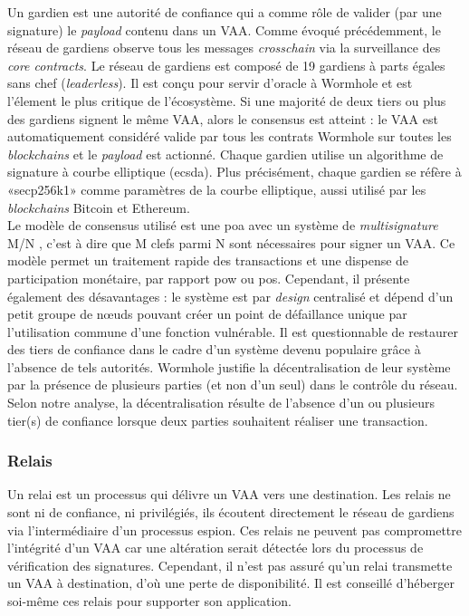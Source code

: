 Un gardien \cite{wormholeGuardian} est une autorité de confiance qui a comme rôle de valider 
(par une signature) le \textit{payload} contenu dans un VAA.
Comme évoqué précédemment, le réseau de gardiens observe tous les messages \textit{crosschain} via la 
surveillance des \textit{core contracts}.
Le réseau de gardiens est composé de 19 gardiens à parts égales sans chef (\textit{leaderless}).
Il est conçu pour servir d'oracle à \gls{Wormhole} et est l'élement le plus critique de l'écosystème.
Si une majorité de deux tiers ou plus des gardiens signent le même VAA, alors le consensus est atteint : 
le VAA est automatiquement considéré valide par  tous les contrats \gls{Wormhole} sur toutes les 
\textit{\gls{blockchain}s} et le \textit{payload} est actionné. 
Chaque gardien utilise un algorithme de signature à courbe elliptique (\acrshort{ecsda}).
Plus précisément, chaque gardien se réfère à «secp256k1» comme paramètres de la courbe elliptique, 
aussi utilisé par les \textit{\gls{blockchain}s} \gls{Bitcoin} et \gls{Ethereum}.\\
Le modèle de consensus utilisé est une \acrshort{poa} avec un système de 
\textit{multisignature} M/N \cite{wormholeChainswap}, c'est à dire que M clefs parmi N sont nécessaires 
pour signer un VAA. Ce modèle permet un traitement rapide des transactions et une dispense de participation monétaire, par rapport \acrshort{pow} ou \acrshort{pos}. Cependant, il présente également des désavantages : le système est par 
\textit{design} centralisé et dépend d'un petit groupe de nœuds pouvant créer un point de 
défaillance unique par l'utilisation commune d'une fonction vulnérable. Il est questionnable de restaurer des tiers de confiance dans le cadre d'un système 
devenu populaire grâce à l'absence de tels autorités. \gls{Wormhole} justifie la décentralisation de leur 
système \cite{wormholeGuardian} par la présence de plusieurs parties (et non d'un seul) dans le contrôle du réseau.
Selon notre analyse, la décentralisation résulte de l'absence d'un ou plusieurs tier(s) de confiance lorsque deux parties 
souhaitent réaliser une transaction.

\subsubsection{Relais}

Un relai \cite{wormholeRelayer} est un processus qui délivre un VAA vers une destination.
Les relais ne sont ni de confiance, ni privilégiés, ils écoutent directement le réseau de gardiens 
via l'intermédiaire d'un processus espion. Ces relais ne peuvent pas compromettre l'intégrité d'un VAA 
car une altération serait détectée lors du processus de vérification des signatures. Cependant, il n'est 
pas assuré qu'un relai transmette un VAA à destination, d'où une perte de disponibilité. Il est conseillé
d'héberger soi-même ces relais pour supporter son application.

